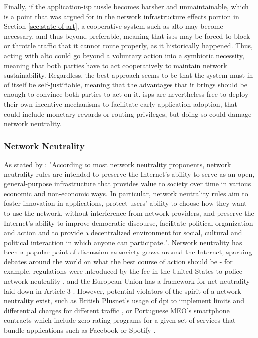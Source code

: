     Finally, if the application-\gls{isp} tussle becomes harsher and unmaintainable, which is a point that was argued for in the network infrastructure effects portion in Section \ref{sec:state-of-art}, a cooperative system such as \gls{alto} may become necessary, and thus beyond preferable, meaning that \glspl{isp} may be forced to block or throttle traffic that it cannot route properly, as it historically happened.
    Thus, acting with \gls{alto} could go beyond a voluntary action into a symbiotic necessity, meaning that both parties have to act cooperatively to maintain network sustainability.
    Regardless, the best approach seems to be that the system must in of itself be self-justifiable, meaning that the advantages that it brings should be enough to convince both parties to act on it.
    \glspl{isp} are nevertheless free to deploy their own incentive mechanisms to facilitate early application adoption, that could include monetary rewards or routing privileges, but doing so could damage network neutrality.

\subsubsection{Network Neutrality}
    As stated by \cite{qos-framework}: "According to most network neutrality proponents, network neutrality rules are intended to preserve the Internet's ability to serve as an open, general-purpose infrastructure that provides value to society over time in various economic and non-economic ways. In particular, network neutrality rules aim to foster innovation in applications, protect users' ability to choose how they want to use the network, without interference from network providers, and preserve the Internet's ability to improve democratic discourse, facilitate political organization and action and to provide a decentralized environment for social, cultural and political interaction in which anyone can participate.".
    Network neutrality has been a popular point of discussion as society grows around the Internet, sparking debates around the world on what the best course of action should be - for example, regulations were introduced by the \gls{fcc} \cite{fcc} in the United States to police network neutrality \cite{fcc}, and the European Union has a framework for net neutrality laid down in Article 3 \cite{article-3}.
    However, potential violators of the spirit of a network neutrality exist, such as British Plusnet's \cite{plusnet} usage of \gls{dpi} to implement limits and differential charges for different traffic \cite{arstechnica}, or Portuguese MEO's \cite{meo} smartphone contracts which include zero rating programs for a given set of services \cite{meo-packages} that bundle applications such as Facebook \cite{Facebook} or Spotify \cite{spotify}.

